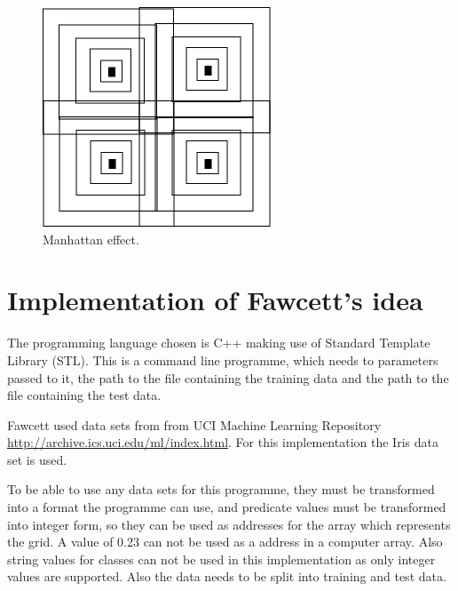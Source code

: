 \documentclass[11pt]{article}
\begin{document}
\begin{figure}[htb]
\centering
\includegraphics[width=30em \textwidth]{./manhattan_effect.png}
\caption{Manhattan effect.}
\end{figure}
\section{Implementation of Fawcett's \cite{fawcett08} idea}
\label{sec-4}



The programming language chosen is C++ making use of Standard Template
Library (STL).  This is a command line programme, which needs to
parameters passed to it, the path to the file containing the training
data and the path to the file containing the test data.

Fawcett \cite{fawcett08} used data sets from from UCI Machine Learning
Repository \href{http://archive.ics.uci.edu/ml/index.html}{http://archive.ics.uci.edu/ml/index.html}.  For this
implementation the Iris data set is used.

To be able to use any data sets for this programme, they must be
transformed into a format the programme can use, and predicate values
must be transformed into integer form, so they can be used as
addresses for the array which represents the grid.  A value of 0.23
can not be used as a address in a computer array.  Also string values
for classes can not be used in this implementation as only integer
values are supported.  Also the data needs to be split into training
and test data. 
\end{document}
